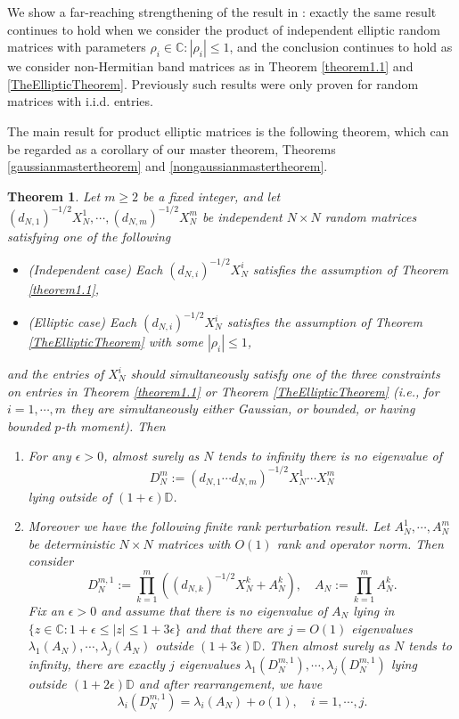 \documentclass[11pt,reqno]{amsart}
\theoremstyle{plain}
\newtheorem{theorem}{Theorem}[section]
\theoremstyle{remark}
\numberwithin{equation}{section}
\begin{document}
We show a far-reaching strengthening of the result in \cite{coston2020outliers}: exactly the same result continues to hold when we consider the product of independent elliptic random matrices with parameters $\rho_i\in\mathbb{C}:|\rho_i|\leq 1$, and the conclusion continues to hold as we consider non-Hermitian band matrices as in Theorem \ref{theorem1.1} and \ref{TheEllipticTheorem}. Previously such results were only proven for random matrices with i.i.d. entries. 


The main result for product elliptic matrices is the following theorem, which can be regarded as a corollary of our master theorem, Theorems \ref{gaussianmastertheorem} and \ref{nongaussianmastertheorem}.



\begin{theorem}\label{outliersofproducts} Let $m\geq 2$ be a fixed integer, and let $(d_{N,1})^{-1/2}X_N^1,\cdots,(d_{N,m})^{-1/2}X_N^m$ be independent $N\times N$ random matrices satisfying one of the following
\begin{itemize}
    \item (Independent case) Each $(d_{N,i})^{-1/2}X_N^i$ satisfies the assumption of Theorem \ref{theorem1.1},
 \item (Elliptic case) Each $(d_{N,i})^{-1/2}X_N^i$ satisfies the assumption of Theorem \ref{TheEllipticTheorem} with some $|\rho_i|\leq 1$, \end{itemize}and the entries of $X_N^i$ should simultaneously satisfy one of the three constraints on entries in Theorem \ref{theorem1.1} or Theorem \ref{TheEllipticTheorem} (i.e., for $i=1,\cdots,m$ they are simultaneously either Gaussian, or bounded, or having bounded $p$-th moment). Then 
 \begin{enumerate}\item For any $\epsilon>0$, almost surely as $N$ tends to infinity there is no eigenvalue of $$D_N^m:=(d_{N,1}\cdots d_{N,m})^{-1/2}X_N^1
\cdots X_N^m$$ lying outside of $(1+\epsilon)\mathbb{D}$. \item Moreover we have the following finite rank perturbation result. Let $A_N^1,\cdots,A_N^m$ be deterministic $N\times N$ matrices with $O(1)$ rank and operator norm. Then consider $$D_N^{m,1}:=\prod_{k=1}^m \left((d_{N,k})^{-1/2}X_N^k+A_N^k\right),\quad A_N:=\prod_{k=1}^m A_N^k.$$ Fix an $\epsilon>0$ and assume that there is no eigenvalue of $A_N$ lying in $\{z\in\mathbb{C}:1+\epsilon\leq|z|\leq 1+3\epsilon\}$ and that there are $j=O(1)$ eigenvalues $\lambda_1(A_N),\cdots,\lambda_j(A_N)$ outside $(1+3\epsilon)\mathbb{D}$. Then almost surely as $N$ tends to infinity, there are exactly $j$ eigenvalues $\lambda_1(D_N^{m,1}),\cdots,\lambda_j(D_N^{m,1})$ lying outside $(1+2\epsilon)\mathbb{D}$ and after rearrangement, we have
    $$\lambda_i(D_N^{m,1})=\lambda_i(A_N)+o(1),\quad i=1,\cdots,j.$$
\end{enumerate}    
\end{theorem}
\end{document}
